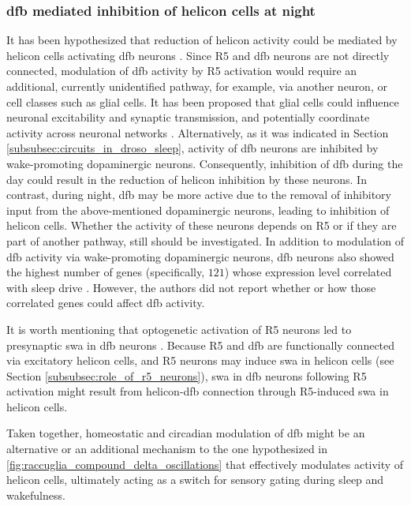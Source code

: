 \documentclass[../main.tex]{subfiles}
\begin{document}
\subsubsection{\texorpdfstring{\acrshort{dfb}}{dFB} mediated inhibition of helicon cells at night}

It has been hypothesized that reduction of helicon activity could be mediated by helicon cells activating \gls{dfb} neurons \cite{raccugliaCoherentMultilevelNetwork2022}.
Since R5 and \gls{dfb} neurons are not directly connected, modulation of \gls{dfb} activity by R5 activation would require an additional, currently unidentified pathway, for example, via another neuron, or cell classes such as glial cells.
It has been proposed that glial cells could influence neuronal excitability and synaptic transmission, and potentially coordinate activity across neuronal networks \cite{fieldsNewInsightsNeuronglia2002}.
Alternatively, as it was indicated in Section \ref{subsubsec:circuits_in_droso_sleep}, activity of \gls{dfb} neurons are inhibited by wake-promoting dopaminergic neurons.
Consequently, inhibition of \gls{dfb} during the day could result in the reduction of helicon inhibition by these neurons. In contrast, during night, \gls{dfb} may be more active due to the removal of inhibitory input from the above-mentioned dopaminergic neurons, leading to inhibition of helicon cells.
Whether the activity of these neurons depends on R5 or if they are part of another pathway, still should be investigated. In addition to modulation of \gls{dfb} activity via wake-promoting dopaminergic neurons, \gls{dfb} neurons also showed the highest number of genes (specifically, $121$) whose expression level correlated with sleep drive \cite{doppSinglecellTranscriptomicsReveals2024}. However, the authors did not report whether or how those correlated genes could affect \gls{dfb} activity.

It is worth mentioning that optogenetic activation of R5 neurons led to presynaptic \gls{swa} in \gls{dfb} neurons \cite{raccugliaCoherentMultilevelNetwork2022}.
Because R5 and \gls{dfb} are functionally connected via excitatory helicon cells, and R5 neurons may induce \gls{swa} in helicon cells (see Section \ref{subsubsec:role_of_r5_neurons}), \gls{swa} in \gls{dfb} neurons following R5 activation might result from helicon-\gls{dfb} connection through R5-induced \gls{swa} in helicon cells.

Taken together, homeostatic and circadian modulation of \gls{dfb} might be an alternative or an additional mechanism to the one hypothesized in \ref{fig:raccuglia_compound_delta_oscillations} that effectively modulates activity of helicon cells, ultimately acting as a switch for sensory gating during sleep and wakefulness.
\end{document}
